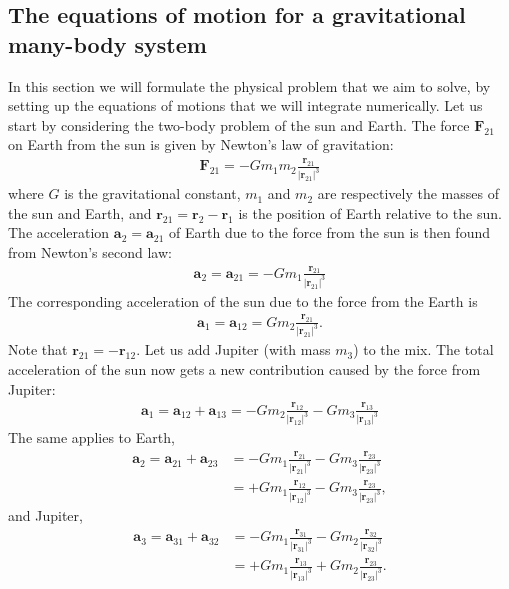\documentclass{article}
\newcommand{\mb}[1]{\mathbf{#1}}
\begin{document}
\subsection{The equations of motion for a gravitational many-body system} \label{section:eom}
In this section we will formulate the physical problem that we aim to solve, by setting up the equations of motions that we will integrate numerically. Let us start by considering the two-body problem of the sun and Earth. The force $\mb{F}_{21}$ on Earth from the sun is given by Newton's law of gravitation:
\begin{align*}
    \mb{F}_{21} = -G m_1 m_2\frac{\mb{r}_{21}}{{|\mb{r}_{21}|}^3}
\end{align*}
where $G$ is the gravitational constant, $m_1$ and $m_2$ are respectively the masses of the sun and Earth, and $\mb{r}_{21} = \mb{r}_2 - \mb{r}_1$ is the position of Earth relative to the sun. The acceleration $\mb{a}_2 = \mb{a}_{21}$ of Earth due to the force from the sun is then found from Newton's second law:
\begin{align*}
    \mb{a}_2 = \mb{a}_{21} = -G m_1\frac{\mb{r}_{21}}{{|\mb{r}_{21}|}^3}
\end{align*}
The corresponding acceleration of the sun due to the force from the Earth is
\begin{align*}
    \mb{a}_1 = \mb{a}_{12} = G m_2\frac{\mb{r}_{21}}{{|\mb{r}_{21}|}^3}.
\end{align*}
Note that $\mb{r}_{21} = -\mb{r}_{12}$. Let us add Jupiter (with mass $m_3$) to the mix. The total acceleration of the sun now gets a new contribution caused by the force from Jupiter:
\begin{align*}
    \mb{a}_1 = \mb{a}_{12} + \mb{a}_{13} = -G m_2\frac{\mb{r}_{12}}{{|\mb{r}_{12}|}^3} - G m_3\frac{\mb{r}_{13}}{{|\mb{r}_{13}|}^3}
\end{align*}
The same applies to Earth,
\begin{align*}
    \mb{a}_2 = \mb{a}_{21} + \mb{a}_{23} &= -G m_1\frac{\mb{r}_{21}}{{|\mb{r}_{21}|}^3} - G m_3\frac{\mb{r}_{23}}{{|\mb{r}_{23}|}^3} \\
    &= +G m_1\frac{\mb{r}_{12}}{{|\mb{r}_{12}|}^3} - G m_3\frac{\mb{r}_{23}}{{|\mb{r}_{23}|}^3},
\end{align*}
and Jupiter,
\begin{align*}
    \mb{a}_3 = \mb{a}_{31} + \mb{a}_{32} &= -G m_1\frac{\mb{r}_{31}}{{|\mb{r}_{31}|}^3} - G m_2\frac{\mb{r}_{32}}{{|\mb{r}_{32}|}^3} \\
    &= +G m_1\frac{\mb{r}_{13}}{{|\mb{r}_{13}|}^3} + G m_2\frac{\mb{r}_{23}}{{|\mb{r}_{23}|}^3}.
\end{align*}
\end{document}
